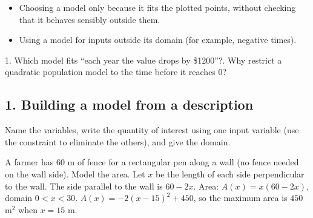 \begin{mistakes}
\begin{itemize}
\item Choosing a model only because it fits the plotted points, without checking that it behaves sensibly outside them.
\item Using a model for inputs outside its domain (for example, negative times).
\end{itemize}
\end{mistakes}

\begin{quickcheck}
1. Which model fits ``each year the value drops by \$1200''?. Why restrict a quadratic population model to the time before it reaches $0$?
\end{quickcheck}


\subsection*{1. Building a model from a description}
Name the variables, write the quantity of interest using one input variable (use the constraint to eliminate the others), and give the domain.

\begin{example}
A farmer has 60 m of fence for a rectangular pen along a wall (no fence needed on the wall side). Model the area.
\sol Let $x$ be the length of each side perpendicular to the wall. The side parallel to the wall is $60-2x$. Area: $A(x)=x(60-2x)$, domain $0<x<30$. $A(x)=-2(x-15)^2+450$, so the maximum area is $450$ m$^2$ when $x=15$ m.
\begin{center}
\end{center}
\end{example}

